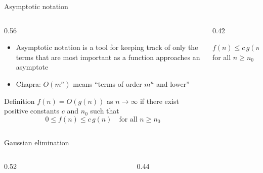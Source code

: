 \documentclass[aspectratio=169]{beamer}
\begin{document}
\begin{frame}{Asymptotic notation}
  \begin{columns}[T]
    \begin{column}{0.56\textwidth}
      \small
      \begin{itemize}
        \item Asymptotic notation is a tool for keeping track of only the
          terms that are most important as a function approaches an
          asymptote
          \pause
        \item Chapra: $O(m^n)$ means ``terms of order $m^n$ and lower''
      \end{itemize}
      \pause
      \vspace{0.5em}
      \begin{block}{Definition}
        $f(n) = O(g(n))$ as $n \to \infty$ if there exist positive
        constants $c$ and $n_0$ such that
        \vspace{-0.3em}
        \[ 0 \leq f(n) \leq c\,g(n) \quad\text{for all } n \geq n_0 \]
      \end{block}
    \end{column}
    \begin{column}{0.42\textwidth}
      \centering
      \par\vspace{0.5em}
      {\small $f(n) \leq c\,g(n)$ for all $n \geq n_0$}
    \end{column}
  \end{columns}
\end{frame}

\begin{frame}{Gaussian elimination}
  \begin{columns}[T]
    \begin{column}{0.52\textwidth}
      {\scriptsize}
    \end{column}
    \begin{column}{0.44\textwidth}
    \end{column}
  \end{columns}
\end{frame}
\end{document}
